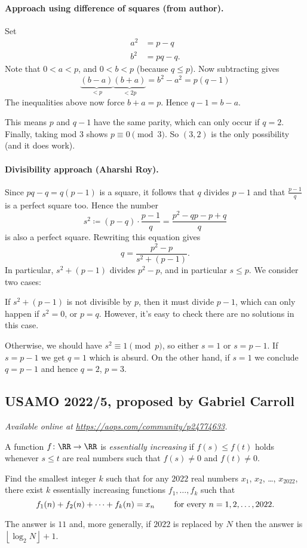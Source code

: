 \documentclass[11pt]{scrartcl}
\begin{document}
\paragraph{Approach using difference of squares (from author).}
Set
\begin{align*}
  a^2 &= p-q \\
  b^2 &= pq-q.
\end{align*}
Note that $0 < a < p$, and $0 < b < p$ (because $q \le p$).
Now subtracting gives
\[ \underbrace{(b-a)}_{<p} \underbrace{(b+a)}_{<2p} = b^2-a^2 = p(q-1) \]
The inequalities above now force $b+a = p$.
Hence $q-1 = b-a$.

This means $p$ and $q-1$ have the same parity,
which can only occur if $q = 2$.
Finally, taking mod $3$ shows $p \equiv 0 \pmod 3$.
So $(3,2)$ is the only possibility (and it does work).

\paragraph{Divisibility approach (Aharshi Roy).}
Since $pq-q = q(p-1)$ is a square, it follows that $q$ divides $p-1$
and that $\frac{p-1}{q}$ is a perfect square too.
Hence the number
\[ s^2 \coloneqq (p-q) \cdot \frac{p-1}{q} = \frac{p^2-qp-p+q}{q} \]
is also a perfect square.
Rewriting this equation gives
\[ q = \frac{p^2-p}{s^2 + (p-1)}. \]
In particular, $s^2 + (p-1)$ divides $p^2-p$, and in particular $s \leq p$.
We consider two cases:
\begin{itemize}
  \ii If $s^2+(p-1)$ is not divisible by $p$, then it must divide $p-1$,
  which can only happen if $s^2 = 0$, or $p = q$.
  However, it's easy to check there are no solutions in this case.

  \ii Otherwise, we should have $s^2 \equiv 1 \pmod p$,
  so either $s = 1$ or $s = p-1$.
  If $s = p-1$ we get $q=1$ which is absurd.
  On the other hand, if $s=1$ we conclude $q = p-1$ and hence $q=2$, $p=3$.
\end{itemize}
\pagebreak

\subsection{USAMO 2022/5, proposed by Gabriel Carroll}
\textsl{Available online at \url{https://aops.com/community/p24774633}.}
\begin{mdframed}[style=mdpurplebox,frametitle={Problem statement}]
A function $f \colon \RR \to \RR$ is
\emph{essentially increasing}
if $f(s) \leq f(t)$ holds
whenever $s\leq t$ are real numbers such that $f(s)\neq 0$ and $f(t)\neq 0$.

Find the smallest integer $k$ such that
for any $2022$ real numbers $x_1$, $x_2$, \dots, $x_{2022}$,
there exist $k$ essentially increasing functions $f_1, \dots, f_k$ such that
\[ f_1(n) + f_2(n) + \dotsb + f_k(n) = x_n
  \qquad \hbox{ for every } n = 1, 2, \dots, 2022. \]
\end{mdframed}
The answer is $11$ and, more generally, if $2022$ is replaced by $N$
then the answer is $\left\lfloor \log_2 N \right\rfloor + 1$.
\end{document}
